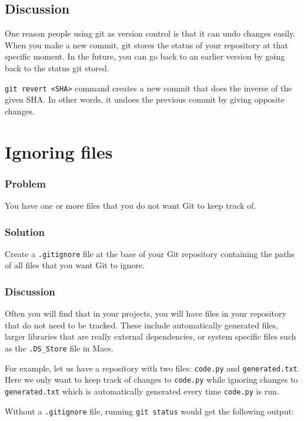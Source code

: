 \documentclass[12pt]{report}
\newcommand\code[1]{{\color{blue}\texttt{#1}}}
\begin{document}
\subsection*{Discussion}


One reason people using git as version control is that it can undo changes easily. When you make a new commit, git stores the status of your repository at that specific moment. In the future, you can go back to an earlier version by going back to the status git stored.

\code{git revert <SHA>} command creates a new commit that does the inverse of the given SHA. In other words, it undoes the previous commit by giving opposite changes.

\section{Ignoring files}

\subsubsection*{Problem}

You have one or more files that you do not want Git to keep track of.

\subsubsection*{Solution}

Create a \texttt{.gitignore} file at the base of your Git repository containing the paths of all files that you want Git to ignore.

\subsubsection*{Discussion}

Often you will find that in your projects, you will have files in your repository that do not need to be tracked.  These include automatically generated files, larger libraries that are really external dependencies, or system specific files such as the \texttt{.DS\_Store} file in Macs.

For example, let us have a repository with two files: \texttt{code.py} and \texttt{generated.txt}.  Here we only want to keep track of changes to \texttt{code.py} while ignoring changes to \texttt{generated.txt} which is automatically generated every time \texttt{code.py} is run.

Without a \code{.gitignore} file, running \code{git status} would get the following output:
\end{document}
